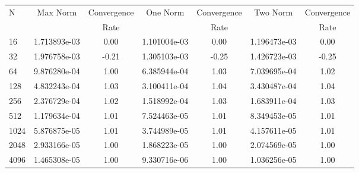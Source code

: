\documentclass[12pt]{article}
\begin{document}
	\begin{tabular}{l|c|c|c|c|c|c}
		N&Max Norm&Convergence&One Norm&Convergence&Two Norm&Convergence\\
		&&Rate&&Rate&&Rate\\
		\hline
		16&1.713893e-03&0.00&1.101004e-03&0.00&1.196473e-03&0.00\\
		\hline
		32&1.976758e-03&-0.21&1.305103e-03&-0.25&1.426723e-03&-0.25\\
		\hline
		64&9.876280e-04&1.00&6.385944e-04&1.03&7.039695e-04&1.02\\
		\hline
		128&4.832243e-04&1.03&3.100411e-04&1.04&3.430487e-04&1.04\\
		\hline
		256&2.376729e-04&1.02&1.518992e-04&1.03&1.683911e-04&1.03\\
		\hline
		512&1.179634e-04&1.01&7.524463e-05&1.01&8.349453e-05&1.01\\
		\hline
		1024&5.876875e-05&1.01&3.744989e-05&1.01&4.157611e-05&1.01\\
		\hline
		2048&2.933166e-05&1.00&1.868223e-05&1.00&2.074569e-05&1.00\\
		\hline
		4096&1.465308e-05&1.00&9.330716e-06&1.00&1.036256e-05&1.00\\
	\end{tabular}
\end{document}
